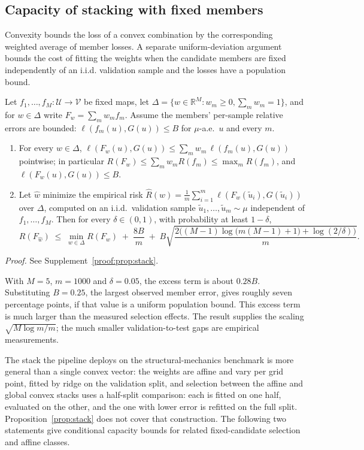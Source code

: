 \subsection{Capacity of stacking with fixed members}
\label{sec:theory-stack}

Convexity bounds the loss of a convex combination by the corresponding
weighted average of member losses. A separate uniform-deviation argument
bounds the cost of fitting the weights when the candidate members are fixed
independently of an i.i.d. validation sample and the losses have a population
bound.

\begin{proposition}\label{prop:stack}
Let $f_1,\dots,f_M:\mathcal U\to\mathcal V$ be fixed maps, let
$\Delta=\{w\in\mathbb R^M:w_m\ge0,\sum_m w_m=1\}$, and for $w\in\Delta$ write
$F_w=\sum_m w_m f_m$. Assume the members' per-sample relative errors are
bounded: $\ell(f_m(u),G(u))\le B$ for $\mu$-a.e.\ $u$ and every $m$.
\begin{enumerate}
\item[(i)] For every $w\in\Delta$,
$\ell(F_w(u),G(u))\le\sum_m w_m\,\ell(f_m(u),G(u))$ pointwise; in particular
$R(F_w)\le\sum_m w_m R(f_m)\le\max_m R(f_m)$, and $\ell(F_w(u),G(u))\le B$.
\item[(ii)] Let $\widehat w$ minimize the empirical risk
$\widehat R(w)=\tfrac1m\sum_{i=1}^m\ell(F_w(\tilde u_i),G(\tilde u_i))$ over
$\Delta$, computed on an i.i.d.\ validation sample
$\tilde u_1,\dots,\tilde u_m\sim\mu$ independent of $f_1,\dots,f_M$. Then for
every $\delta\in(0,1)$, with probability at least $1-\delta$,
\[
R(F_{\widehat w})\;\le\;\min_{w\in\Delta}R(F_w)\;+\;\frac{8B}{m}\;+\;
B\sqrt{\frac{2\big((M-1)\log\!\big(m(M-1)+1\big)+\log(2/\delta)\big)}{m}} .
\]
\end{enumerate}
\end{proposition}
\noindent\emph{Proof.} See Supplement~\ref{proof:prop:stack}.


With $M=5$, $m=1000$ and $\delta=0.05$, the excess term is about
$0.28B$. Substituting $B=0.25$, the largest observed member error, gives
roughly seven percentage points, if that value is a uniform population bound. This excess term is much larger than the measured selection effects. The result supplies the scaling $\sqrt{M\log m/m}$;
the much smaller validation-to-test gaps are empirical measurements.

The stack the pipeline deploys on the structural-mechanics benchmark is more general
than a single convex vector: the weights are affine and vary per grid point,
fitted by ridge on the validation split, and selection between the affine and global convex stacks uses a half-split
comparison: each is fitted on one half, evaluated on the other, and the
one with lower error is refitted on the full split. Proposition~\ref{prop:stack} does not cover that
construction. The following two statements give conditional capacity bounds
for related fixed-candidate selection and affine classes.

